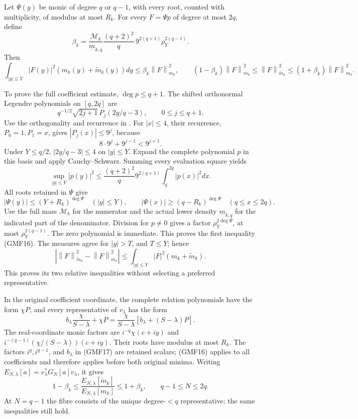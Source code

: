 \documentclass[11pt]{article}
\newcommand{\norm}[1]{\left\lVert#1\right\rVert}
\begin{document}
Let \(\Psi(y)\) be monic of degree \(q\) or \(q-1\), with
every root, counted with multiplicity, of modulus at most \(R_k\).
For every \(F=\Psi p\) of degree at most \(2q\), define
\begin{equation}\tag{GMF15}
 \beta_k=
 \frac{\mathcal M_k}{\underline m_{k,q}}
 \frac{(q+2)^2}{q}\,9^{2(q+1)}
                     \rho_Y^{2(q-1)}.
\end{equation}
Then
\begin{equation}\tag{GMF16}
 \int_{|y|\le Y}|F(y)|^2(m_k(y)+\widetilde m_k(y))dy
 \le\beta_k\norm F_{m_k}^2,\qquad
 (1-\beta_k)\norm F_{m_k}^2
 \le\norm F_{\widetilde m_k}^2
 \le(1+\beta_k)\norm F_{m_k}^2.
\end{equation}

To prove the full coefficient estimate, \(\deg p\le q+1\).
The shifted orthonormal Legendre polynomials on \([q,2q]\)
are
\[
 q^{-1/2}\sqrt{2j+1}\,P_j(2y/q-3),\qquad 0\le j\le q+1.
\]
Use the orthogonality and recurrence in
\cite[Tables 18.3.1 and 18.9.1]{dlmfLegendre}.
For \(|x|\le4\), their recurrence, \(P_0=1,P_1=x\), gives
\(|P_j(x)|\le9^j\), because
\[
 8\cdot9^j+9^{j-1}<9^{j+1}.
\]
Under \(Y\le q/2\), \(|2y/q-3|\le4\) on \(|y|\le Y\).
Expand the complete polynomial \(p\) in this basis and
apply Cauchy--Schwarz.  Summing every evaluation square yields
\[
 \sup_{|y|\le Y}|p(y)|^2
 \le\frac{(q+2)^2}{q}9^{2(q+1)}
                         \int_q^{2q}|p(x)|^2dx.
\]
All roots retained in \(\Psi\) give
\[
 |\Psi(y)|\le(Y+R_k)^{\deg\Psi}\quad(|y|\le Y),\qquad
 |\Psi(x)|\ge(q-R_k)^{\deg\Psi}\quad(q\le x\le2q).
\]
Use the full mass \(\mathcal M_k\) for the numerator and the
actual lower density \(\underline m_{k,q}\) for the indicated
part of the denominator.  Division for \(p\ne0\) gives a
factor \(\rho_Y^{2\deg\Psi}\), at most
\(\rho_Y^{2(q-1)}\).  The zero polynomial is immediate.
This proves the first inequality (GMF16).
The measures agree for \(|y|>T\), and \(T\le Y\); hence
\[
 |\norm F_{\widetilde m_k}^2-\norm F_{m_k}^2|
 \le\int_{|y|\le Y}|F|^2(m_k+\widetilde m_k).
\]
This proves its two relative inequalities without selecting
a preferred representative.

In the original coefficient coordinate, the complete relation
polynomials have the form \(\chi P\), and every representative
of \(v_\lambda\) has the form
\begin{equation}\tag{GMF17}
 b_\lambda\frac{\chi}{S-\lambda}+\chi P
 =\frac{\chi}{S-\lambda}
                  [b_\lambda+(S-\lambda)P].
\end{equation}
The real-coordinate monic factors are
\(i^{-q}\chi(c+iy)\) and
\(i^{-(q-1)}(\chi/(S-\lambda))(c+iy)\).
Their roots have modulus at most \(R_k\).
The factors \(i^q,i^{q-1}\), and \(b_\lambda\) in (GMF17)
are retained scalars; (GMF16) applies to all coefficients and
therefore applies before both original minima.
Writing
\(E_{N,\lambda}[a]=v_\lambda^*G_N[a]v_\lambda\), it gives
\begin{equation}\tag{GMF18}
 1-\beta_k\le
 \frac{E_{N,\lambda}[\widetilde m_k]}{E_{N,\lambda}[m_k]}
 \le1+\beta_k,\qquad q-1\le N\le2q.
\end{equation}
At \(N=q-1\) the fibre consists of the unique degree-\(<q\)
representative; the same inequalities still hold.
\end{document}
